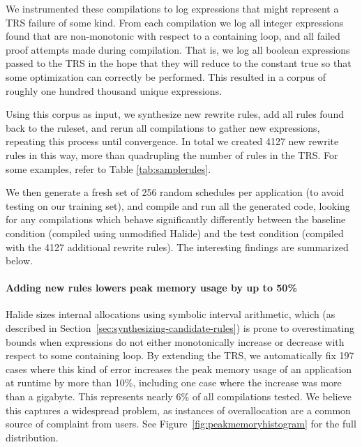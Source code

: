 \documentclass[acmsmall]{acmart}\settopmatter{}
\begin{document}
We instrumented these compilations to log expressions that might represent a TRS failure of some kind. From each compilation we log all integer expressions found that are non-monotonic with respect to a containing loop, and all failed proof attempts made during compilation. That is, we log all boolean expressions passed to the TRS in the hope that they will reduce to the constant true so that some optimization can correctly be performed. This resulted in a corpus of roughly one hundred thousand unique expressions.

Using this corpus as input, we synthesize new rewrite rules, add all rules found back to the ruleset, and rerun all compilations to gather new expressions, repeating this process until convergence. In total we created 4127 new rewrite rules in this way, more than quadrupling the number of rules in the TRS. For some examples, refer to Table \ref{tab:samplerules}.

We then generate a fresh set of 256 random schedules per application (to avoid testing on our training set), and compile and run all the generated code, looking for any compilations which behave significantly differently between the baseline condition (compiled using unmodified Halide) and the test condition (compiled with the 4127 additional rewrite rules). The interesting findings are summarized below.

\paragraph{Adding new rules lowers peak memory usage by up to 50\%}
Halide sizes internal allocations using symbolic interval arithmetic,
which (as described in Section~\ref{sec:synthesizing-candidate-rules})
is prone to overestimating bounds when
expressions do not either monotonically increase or decrease with
respect to some containing loop. By extending the TRS, we
automatically fix 197 cases where this kind of error increases the
peak memory usage of an application at runtime by more than 10\%, including one
case where the increase was more than a gigabyte. This represents
nearly 6\% of all compilations tested. We believe this captures a
widespread problem, as instances of overallocation are a common source
of complaint from users. See Figure~\ref{fig:peakmemoryhistogram} for
the full distribution. 
\end{document}
